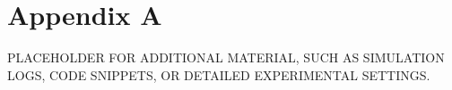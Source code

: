 \documentclass[11pt,a4paper]{article}
\begin{document}
%
%
\printbibliography

%
%
\newpage
\appendix
\section*{Appendix A}

PLACEHOLDER FOR ADDITIONAL MATERIAL, SUCH AS SIMULATION LOGS, CODE SNIPPETS, OR DETAILED EXPERIMENTAL SETTINGS.
\end{document}
